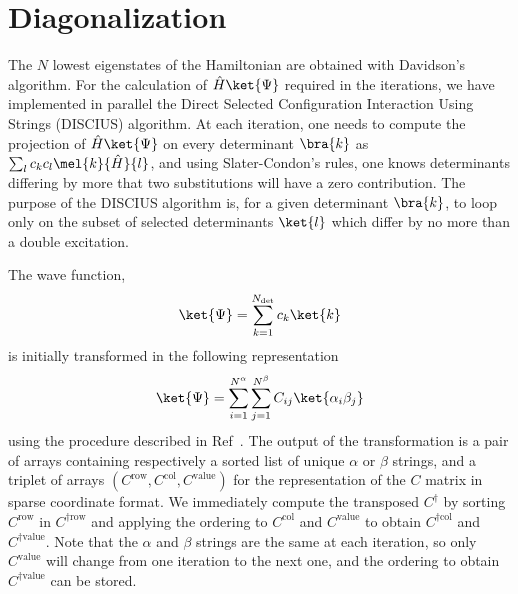 
\newcommand{\Ndet}{N_\text{det}}
\newcommand{\Nalpha}{N^\alpha}
\newcommand{\Nbeta}{N^\beta}
\newcommand{\Cdagval}{C^{\dagger \text{value}}}
\newcommand{\Cdagrow}{C^{\dagger \text{row}}}
\newcommand{\Cdagcol}{C^{\dagger \text{col}}}
\newcommand{\Cval}{C^\text{value}}
\newcommand{\Crow}{C^\text{row}}
\newcommand{\Ccol}{C^\text{col}}
\newcommand{\krow}{{k_\alpha}}
\newcommand{\kcol}{{k_\beta}}
\newcommand{\lrow}{{l_\alpha}}
\newcommand{\lcol}{{l_\beta}}
\newcommand{\excitation}[2]{\mathcal{E}(#1,#2)}
\newcommand{\h}{\hat{H}}


\section{Diagonalization}

The $N$ lowest eigenstates of the Hamiltonian are obtained with Davidson's
algorithm\cite{}. For the calculation of $\h \ket{\Psi}$ required in the
iterations, we have implemented in parallel the Direct Selected Configuration
Interaction Using Strings (DISCIUS) algorithm.\cite{povill_efficient_1995}
At each iteration, one needs to compute the projection of $\h \ket{\Psi}$ on
every determinant $\bra{k}$ as $\sum_l c_k c_l \mel{k}{\h}{l}$, and using 
Slater-Condon's rules, one knows determinants differing by more that two
substitutions will have a zero contribution. The purpose of the DISCIUS
algorithm is, for a given determinant $\bra{k}$, to loop only on the 
subset of selected determinants $\ket{l}$ which differ by no more than a double
excitation. 

The wave function,
\begin{equation}
\ket{\Psi} = \sum_{k=1}^{\Ndet} c_k \ket{k}
\end{equation}
is initially transformed in the following representation
\begin{equation}
\ket{\Psi} = \sum_{i=1}^{\Nalpha} \sum_{j=1}^{\Nbeta} C_{ij} \ket{\alpha_i \beta_j}
\end{equation}
using the procedure described in Ref~. The
output of the transformation is a pair of arrays containing respectively
a sorted list of unique $\alpha$ or $\beta$ strings, and a triplet of arrays 
$(\Crow,\Ccol,\Cval)$ for the representation of the $C$ matrix in
sparse coordinate format. We immediately compute the transposed $C^\dagger$
by sorting $\Crow$ in $\Cdagrow$ and applying the ordering to $\Ccol$ and $\Cval$
to obtain $\Cdagcol$ and $\Cdagval$.
Note that the $\alpha$ and $\beta$ strings are the same at each iteration,
so only $\Cval$ will change from one iteration to the next one, and the
ordering to obtain $\Cdagval$ can be stored.




